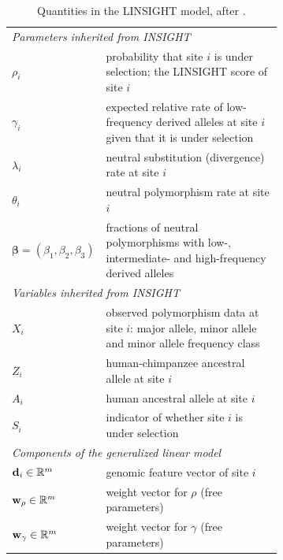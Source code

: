 \begin{table}[!htbp]
  \centering
  \caption{Quantities in the LINSIGHT model, after \citet{huang2017}.}
  \label{tab:linsight}
  \begin{tabular}{lp{0.68\linewidth}}
    \toprule
    \multicolumn{2}{l}{\emph{Parameters inherited from INSIGHT}} \\
    $\rho_i$ & probability that site $i$ is under selection; the LINSIGHT score of site $i$ \\
    $\gamma_i$ & expected relative rate of low-frequency derived alleles at site $i$ given that it is under selection \\
    $\lambda_i$ & neutral substitution (divergence) rate at site $i$ \\
    $\theta_i$ & neutral polymorphism rate at site $i$ \\
    $\boldsymbol\beta=(\beta_1,\beta_2,\beta_3)$ & fractions of neutral polymorphisms with low-, intermediate- and high-frequency derived alleles \\
    \midrule
    \multicolumn{2}{l}{\emph{Variables inherited from INSIGHT}} \\
    $X_i$ & observed polymorphism data at site $i$: major allele, minor allele and minor allele frequency class \\
    $Z_i$ & human-chimpanzee ancestral allele at site $i$ \\
    $A_i$ & human ancestral allele at site $i$ \\
    $S_i$ & indicator of whether site $i$ is under selection \\
    \midrule
    \multicolumn{2}{l}{\emph{Components of the generalized linear model}} \\
    $\mathbf{d}_i\in\mathbb{R}^m$ & genomic feature vector of site $i$ \\
    $\mathbf{w}_\rho\in\mathbb{R}^m$ & weight vector for $\rho$ (free parameters) \\
    $\mathbf{w}_\gamma\in\mathbb{R}^m$ & weight vector for $\gamma$ (free parameters) \\
    \bottomrule
  \end{tabular}
\end{table}

